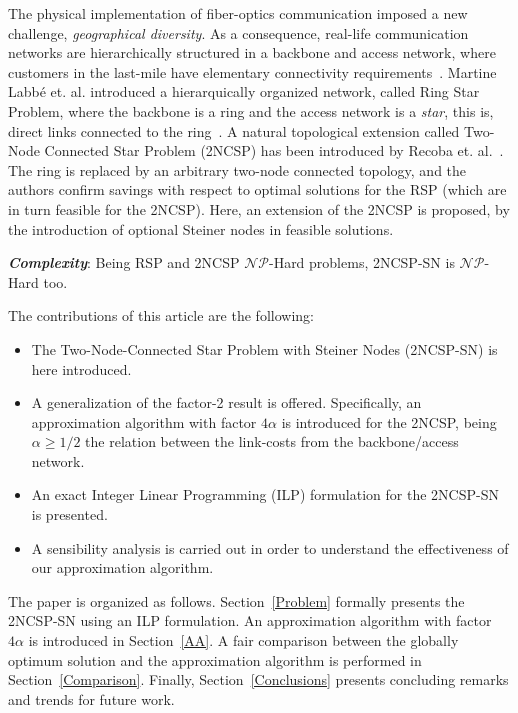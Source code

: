 \documentclass{endm}
\begin{document}
The physical implementation of fiber-optics communication imposed a new challenge, \emph{geographical diversity}. As a consequence,
real-life communication networks are hierarchically structured in a backbone and access network, where customers in the last-mile
have elementary connectivity requirements~\cite{robledo2005grasp}. Martine Labb\'e et. al. introduced
a hierarquically organized network, called Ring Star Problem, where the backbone is a ring and the access network is a \emph{star},
this is, direct links connected to the ring~\cite{labbe2004ring}. A natural topological extension called Two-Node Connected Star Problem (2NCSP)
has been introduced by Recoba et. al.~\cite{recoba2016two}.
The ring is replaced by an arbitrary two-node connected topology, and
the authors confirm savings with respect to optimal solutions for the RSP (which are in turn feasible for the 2NCSP). Here, an extension of the 2NCSP is proposed, by the introduction of optional Steiner nodes in feasible solutions. 

\textbf{\emph{Complexity}}: Being RSP and 2NCSP $\mathcal{NP}$-Hard problems, 2NCSP-SN is $\mathcal{NP}$-Hard too.


The contributions of this article are the following:
\begin{itemize}
\item The Two-Node-Connected Star Problem with Steiner Nodes (2NCSP-SN) is here introduced.
\item A generalization of the factor-2 result is offered. Specifically, an approximation algorithm with factor $4\alpha$ is
introduced for the 2NCSP, being $\alpha \geq 1/2$ the relation between the link-costs from the backbone/access network.
\item An exact Integer Linear Programming (ILP) formulation for the 2NCSP-SN is presented.
\item A sensibility analysis is carried out in order to understand the effectiveness of
our approximation algorithm.
\end{itemize}

The paper is organized as follows. Section~\ref{Problem} formally presents the 2NCSP-SN using an ILP formulation.
An approximation algorithm with factor $4\alpha$ is introduced in Section~\ref{AA}.
A fair comparison between the globally optimum solution and the approximation algorithm is performed in Section~\ref{Comparison}.
Finally, Section~\ref{Conclusions} presents concluding remarks and trends for future work.
\end{document}
